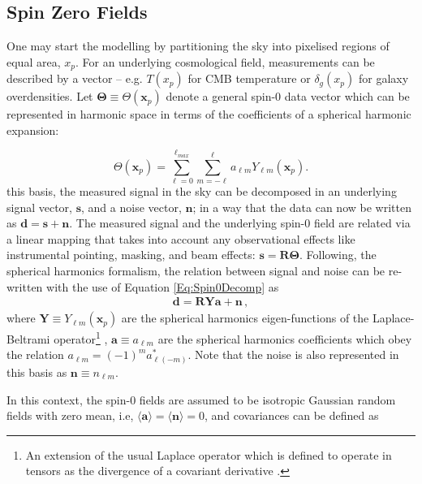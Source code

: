 \subsection{Spin Zero Fields}\label{Sec:BPL:Spin-0_Form}
One may start the modelling by partitioning the sky into pixelised regions of equal area, $x_p$. For an underlying cosmological field, measurements can be described by a vector -- e.g. $T(x_p)$ for CMB temperature or $\delta_g (x_p)$ for galaxy overdensities. Let $\mathbf{\Theta} \equiv \Theta(\mathbf{x}_p)$ denote a general spin-0 data vector which can be represented in harmonic space in terms of the coefficients of a spherical harmonic expansion:

\begin{equation}
\Theta (\mathbf{x}_p) = \sum_{\ell=0}^{\ell_{max}}\sum_{m=-\ell}^{\ell}a_{\ell m}Y_{\ell m}(\mathbf{x}_p).
\label{Eq:Spin0Decomp}
\end{equation}
\noindent this basis, the measured signal in the sky can be decomposed in an underlying signal vector, $\mathbf{s}$, and a noise vector, $\mathbf{n}$; in a way that the data can now be written as $\mathbf{d=s+n}$. The measured signal and the underlying spin-0 field are related via a linear mapping that takes into account any observational effects like instrumental pointing, masking, and beam effects: $\mathbf{s = R\Theta}$. Following, the spherical harmonics formalism, the relation between signal and noise can be re-written with the use of Equation \eqref{Eq:Spin0Decomp} as
\begin{align}
\mathbf{d=RYa+n}\, ,
\label{Eq:DataDecomposed}
\end{align}
\noindent  where $\mathbf{Y} \equiv Y_{\ell m}(\textbf{x}_p)$ are the spherical harmonics eigen-functions of the Laplace-Beltrami operator\footnote{An extension of the usual Laplace operator which is defined to operate in tensors as the divergence of a covariant derivative  \citep{Jost}.} \citep{2008DahlenSimons}, $\mathbf{a} \equiv a_{\ell m}$ are the spherical harmonics coefficients which obey the relation $a_{\ell m} = (-1)^{m}a^*_{\ell (-m)}$. Note that the noise is also represented in this basis as $\textbf{n} \equiv n_{\ell m}$. 

\qquad In this context, the spin-0 fields are assumed to be isotropic Gaussian random fields with zero mean, i.e, $\langle \textbf{a} \rangle = \langle \textbf{n} \rangle = 0$, and covariances can be defined as

